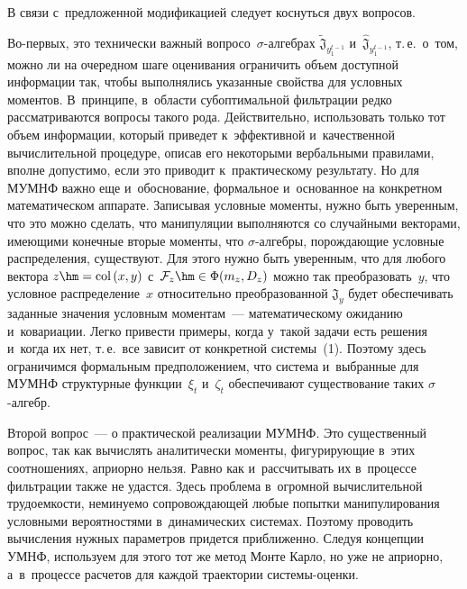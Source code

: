 \begin{multicols}{2}
    В связи с~предложенной модификацией следует коснуться двух вопросов. 

Во-первых, это технически важный вопрос\linebreak о~$\sigma$-ал\-геб\-рах 
$\tilde{\mathfrak{J}}_{y_1^{t-1}}$ и~$\hat{\mathfrak{J}}_{y_1^{t-1}}$, т.\,е.\ 
о~том, можно ли на очередном шаге оценивания ограничить объем доступной 
информации так, чтобы выполнялись указан\-ные свойства для условных 
моментов. В~принципе, в~области субоптимальной фильтрации редко 
рассматриваются вопросы такого рода. Действительно, использовать только тот 
объем информации, который приведет к~эффективной и~качественной 
вычислительной процедуре, описав его некоторыми вербальными правилами, 
вполне допустимо, если это приводит к~практическому результату. Но для 
МУМНФ важно еще и~обоснование, формальное и~основанное на конкретном 
математическом аппарате. Записывая условные моменты, нужно быть 
уверенным, что это можно сделать, что манипуляции выполняются со 
случайными векторами, имеющими конечные вторые моменты, что  
$\sigma$-ал\-геб\-ры, порождающие условные распределения, существуют. Для 
этого нужно быть уверенным, что для любого вектора $z\hm= \mathrm{col}\, (x,y)$ 
с~$\mathcal{F}_z\hm\in \Phi(m_z, D_z)$ можно так преобразовать~$y$, что 
условное распределение~$x$ относительно преобразованной $\mathfrak{J}_y$ 
будет обеспечивать заданные значения условным моментам~--- 
математическому ожиданию и~ковариации. Легко привести примеры, когда 
у~такой задачи есть решения и~когда их нет, т.\,е.\ все зависит от конкретной 
системы~(1). Поэтому здесь ограничимся формальным предположением, что 
система и~выбранные для МУМНФ структурные функции~$\xi_t$ и~$\zeta_t$ 
обеспечивают существование таких $\sigma$-ал\-гебр.
    
    Второй вопрос~--- о практической реализации 
МУМНФ. Это существенный вопрос, так как вычислять аналитически моменты, 
фигурирующие в~этих соотношениях, априорно нель\-зя. Равно как 
и~рассчитывать их в~процессе фильт\-ра\-ции также не удастся. Здесь проблема 
в~огромной вычислительной трудоемкости, неминуемо со\-про\-вож\-да\-ющей 
любые попытки манипулирования условными вероятностями в~динамических 
системах. Поэтому проводить вычисления нужных параметров придется 
приближенно. Следуя концепции УМНФ, используем для этого тот же метод 
Мон\-те Кар\-ло, но уже не априорно, а~в~процессе расчетов для каждой 
траектории сис\-те\-мы-оценки.
    

\end{multicols}
